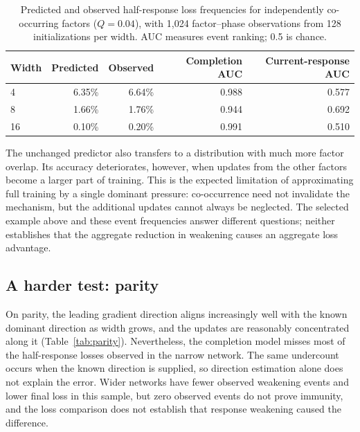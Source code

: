 \documentclass[11pt,a4paper]{article}
\begin{document}
\begin{table}[htbp]
\centering
\caption{Predicted and observed half-response loss frequencies for independently co-occurring factors ($Q=0.04$), with 1,024 factor--phase observations from 128 initializations per width. AUC measures event ranking; 0.5 is chance.}
\label{tab:bridge}
\begin{tabular}{@{}lrrrr@{}}
\toprule
Width & Predicted & Observed & Completion AUC & Current-response AUC \\
\midrule
4  & 6.35\% & 6.64\% & 0.988 & 0.577 \\
8  & 1.66\% & 1.76\% & 0.944 & 0.692 \\
16 & 0.10\% & 0.20\% & 0.991 & 0.510 \\
\bottomrule
\end{tabular}
\end{table}

The unchanged predictor also transfers to a distribution with much more factor overlap. Its accuracy deteriorates, however, when updates from the other factors become a larger part of training. This is the expected limitation of approximating full training by a single dominant pressure: co-occurrence need not invalidate the mechanism, but the additional updates cannot always be neglected. The selected example above and these event frequencies answer different questions; neither establishes that the aggregate reduction in weakening causes an aggregate loss advantage.

\subsection{A harder test: parity}

On parity, the leading gradient direction aligns increasingly well with the known dominant direction as width grows, and the updates are reasonably concentrated along it (Table~\ref{tab:parity}). Nevertheless, the completion model misses most of the half-response losses observed in the narrow network. The same undercount occurs when the known direction is supplied, so direction estimation alone does not explain the error. Wider networks have fewer observed weakening events and lower final loss in this sample, but zero observed events do not prove immunity, and the loss comparison does not establish that response weakening caused the difference.
\end{document}
